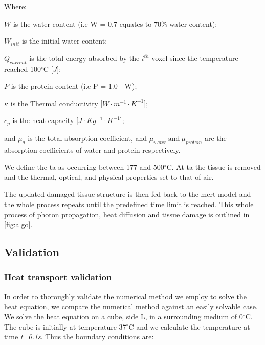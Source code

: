 \noindent Where:

\indent $W$ is the water content (i.e W = 0.7 equates to 70\% water content);

\indent $W_{init}$ is the initial water content;

\indent $Q_{current}$ is the total energy absorbed by the $i^{th}$ voxel since the temperature reached 100$^{\circ}$C [$J$];

\indent $P$ is the protein content (i.e P = 1.0 - W);

\indent $\kappa$ is the Thermal conductivity [$W\cdot m^{-1}\cdot K^{-1}$];

\indent $c_p$ is the heat capacity [$J\cdot Kg^{-1}\cdot K^{-1}$];

\indent and $\mu_a$ is the total absorption coefficient, and $\mu_{water}\ \text{and}\ \mu_{protein}$ are the absorption coefficients of water and protein respectively.

\medskip

We define the \gls{ta} as occurring between 177 and 500$^{\circ}$C\cite{gerstmann1994char,mckenzie1986three}. At \gls{ta} the tissue is removed and the thermal, optical, and physical properties set to that of air.

The updated damaged tissue structure is then fed back to the \gls{mcrt} model and the whole process repeats until the predefined time limit is reached. This whole process of photon propagation, heat diffusion and tissue damage is outlined in \cref{fig:algo}.

\subsection{Validation}%

\subsubsection{Heat transport validation}

In order to thoroughly validate the numerical method we employ to solve the heat equation, we compare the numerical method against an easily solvable case. We solve the heat equation on a cube, side L, in a surrounding medium of 0$^{\circ}$C. The cube is initially at temperature 37$^{\circ}$C and we calculate the temperature at time \textit{t=0.1s}. Thus the boundary conditions are:


